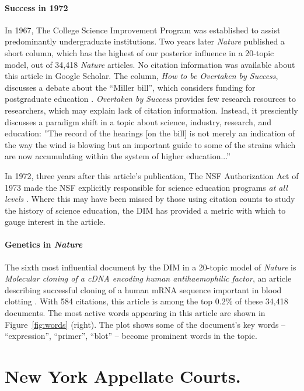 \paragraph{Success in 1972}
In 1967, The College Science Improvement Program was established to
assist predominantly undergraduate institutions.  Two years later
\emph{Nature} published a short column, which has the highest of our
posterior influence in a 20-topic model, out of 34,418 \emph{Nature}
articles.  No citation information was available about this article in
Google Scholar. The column, \emph{How to be Overtaken by Success},
discusses a debate about the ``Miller bill'', which considers funding
for postgraduate education
\cite{Nature.success:1969}. \textit{Overtaken by Success} provides few
research resources to researchers, which may explain lack of citation
information. Instead, it presciently discusses a paradigm shift in a
topic about science, industry, research, and education: ''The record
of the hearings [on the bill] is not merely an indication of the way
the wind is blowing but an important guide to some of the strains
which are now accumulating within the system of higher education...''

In 1972, three years after this article's publication, The NSF
Authorization Act of 1973 made the NSF explicitly responsible for
science education programs \emph{at all levels}
\cite{NSF.website:2010}.  Where this may have been missed by those
using citation counts to study the history of science education, the
DIM has provided a metric with which to gauge interest in the article.


\paragraph{Genetics in \emph{Nature}}
The sixth most influential document by the DIM in a 20-topic model of
\emph{Nature} is \emph{Molecular cloning of a cDNA encoding human
  antihaemophilic factor}, an article describing successful
cloning of a human mRNA sequence important in blood clotting
\cite{toole:1984}.  With 584 citations, this article is among the top
0.2\% of these 34,418 documents.  The most active words
appearing in this article are shown in
Figure~\ref{fig:words} (right).  The plot shows some of the
document's key words -- ``expression'', ``primer'', ``blot'' -- become
prominent words in the topic.

\section{New York Appellate Courts.}

